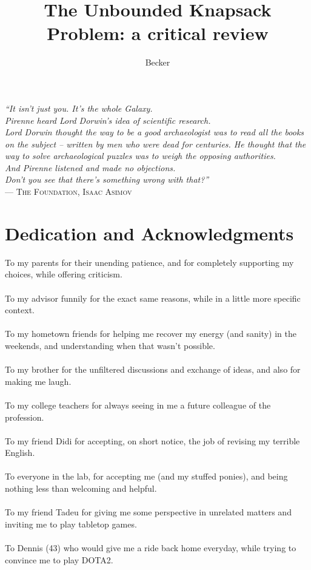 \documentclass[ppgc,diss,english]{iiufrgs}
\title{The Unbounded Knapsack Problem: a critical review}
\author{Becker}{Henrique}
\begin{document}
\maketitle

\clearpage
\begin{flushright}
\mbox{}\vfill
{\sffamily\itshape
``It isn’t just you. It’s the whole Galaxy.\\
Pirenne heard Lord Dorwin’s idea of scientific research.\\
Lord Dorwin thought the way to be a good archaeologist was to read all the books on the subject -- written by men who were dead for centuries.
He thought that the way to solve archaeological puzzles was to weigh the opposing authorities.\\
And Pirenne listened and made no objections.\\
Don’t you see that there’s something wrong with that?''\\}
--- \textsc{The Foundation, Isaac Asimov}
\end{flushright}

\chapter*{Dedication and Acknowledgments}

\noindent
To my parents for their unending patience, and for completely supporting my choices, while offering criticism.\\\\
To my advisor funnily for the exact same reasons, while in a little more specific context.\\\\
To my hometown friends for helping me recover my energy (and sanity) in the weekends, and understanding when that wasn't possible.\\\\
To my brother for the unfiltered discussions and exchange of ideas, and also for making me laugh.\\\\
To my college teachers for always seeing in me a future colleague of the profession.\\\\
To my friend Didi for accepting, on short notice, the job of revising my terrible English.\\\\
To everyone in the lab, for accepting me (and my stuffed ponies), and being nothing less than welcoming and helpful.\\\\
To my friend Tadeu for giving me some perspective in unrelated matters and inviting me to play tabletop games.\\\\
To Dennis (43) who would give me a ride back home everyday, while trying to convince me to play DOTA2.\\\\
\end{document}
